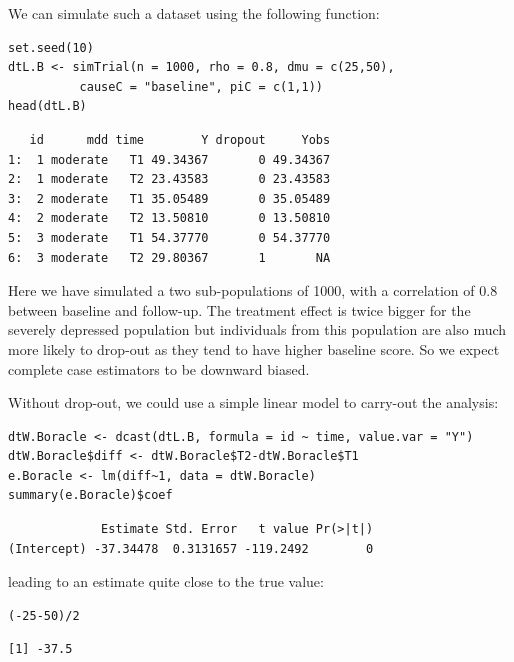 \documentclass[12pt]{article}
\begin{document}
\bigskip

We can simulate such a dataset using the following function:
\lstset{language=r,label= ,caption= ,captionpos=b,numbers=none}
\begin{lstlisting}
set.seed(10)
dtL.B <- simTrial(n = 1000, rho = 0.8, dmu = c(25,50),
		  causeC = "baseline", piC = c(1,1))
head(dtL.B)
\end{lstlisting}

\begin{verbatim}
   id      mdd time        Y dropout     Yobs
1:  1 moderate   T1 49.34367       0 49.34367
2:  1 moderate   T2 23.43583       0 23.43583
3:  2 moderate   T1 35.05489       0 35.05489
4:  2 moderate   T2 13.50810       0 13.50810
5:  3 moderate   T1 54.37770       0 54.37770
6:  3 moderate   T2 29.80367       1       NA
\end{verbatim}


Here we have simulated a two sub-populations of 1000, with a
correlation of 0.8 between baseline and follow-up. The treatment
effect is twice bigger for the severely depressed population but
individuals from this population are also much more likely to drop-out
as they tend to have higher baseline score. So we expect complete case
estimators to be downward biased.

\bigskip

Without drop-out, we could use a simple linear model to carry-out the
analysis:
\lstset{language=r,label= ,caption= ,captionpos=b,numbers=none}
\begin{lstlisting}
dtW.Boracle <- dcast(dtL.B, formula = id ~ time, value.var = "Y")
dtW.Boracle$diff <- dtW.Boracle$T2-dtW.Boracle$T1
e.Boracle <- lm(diff~1, data = dtW.Boracle)
summary(e.Boracle)$coef
\end{lstlisting}

\begin{verbatim}
             Estimate Std. Error   t value Pr(>|t|)
(Intercept) -37.34478  0.3131657 -119.2492        0
\end{verbatim}


\clearpage

leading to an estimate quite close to the true value:
\lstset{language=r,label= ,caption= ,captionpos=b,numbers=none}
\begin{lstlisting}
(-25-50)/2
\end{lstlisting}

\begin{verbatim}
[1] -37.5
\end{verbatim}
\end{document}
